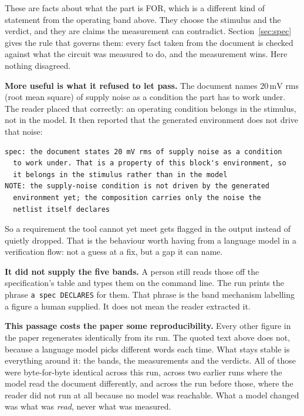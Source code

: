 \documentclass[11pt,a4paper]{article}
\newcommand{\unit}[1]{\,\textrm{#1}}
\begin{document}
\noindent These are facts about what the part is FOR, which is a
different kind of statement from the operating band above. They choose
the stimulus and the verdict, and they are claims the measurement can
contradict. Section~\ref{sec:spec} gives the rule that governs them:
every fact taken from the document is checked against what the circuit
was measured to do, and the measurement wins. Here nothing disagreed.

\textbf{More useful is what it refused to let pass.} The document
names $20\unit{mV}$ rms (root mean square) of supply noise as a
condition the part has to work under. The reader placed that
correctly: an operating condition belongs in the stimulus, not in the
model. It then reported that the generated environment does not drive
that noise:

\begin{lstlisting}
spec: the document states 20 mV rms of supply noise as a condition
  to work under. That is a property of this block's environment, so
  it belongs in the stimulus rather than in the model
NOTE: the supply-noise condition is not driven by the generated
  environment yet; the composition carries only the noise the
  netlist itself declares
\end{lstlisting}

\noindent So a requirement the tool cannot yet meet gets flagged in
the output instead of quietly dropped. That is the behaviour worth
having from a language model in a verification flow: not a guess at a
fix, but a gap it can name.

\textbf{It did not supply the five bands.} A person still reads those
off the specification's table and types them on the command line. The
run prints the phrase \texttt{a spec DECLARES} for them. That phrase
is the band mechanism labelling a figure a human supplied. It does not
mean the reader extracted it.

\textbf{This passage costs the paper some reproducibility.} Every
other figure in the paper regenerates identically from its run. The
quoted text above does not, because a language model picks different
words each time. What stays stable is everything around it: the bands,
the measurements and the verdicts. All of those were byte-for-byte
identical across this run, across two earlier runs where the model
read the document differently, and across the run before those, where
the reader did not run at all because no model was reachable. What a
model changed was what was \emph{read}, never what was measured.
\end{document}
